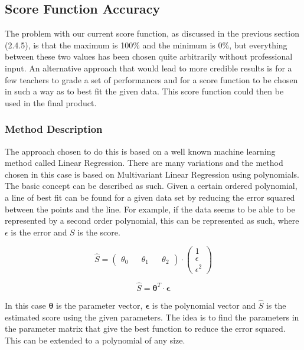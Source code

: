 \documentclass[11pt,a4paper]{article}
\begin{document}
\subsection{Score Function Accuracy}
\noindent
The problem with our current score function, as discussed in the previous section (2.4.5), is that the maximum is 100\% and the minimum is 0\%, but everything between these two values has been chosen quite arbitrarily without professional input. An alternative approach that would lead to more credible results is for a few  teachers to grade a set of performances and for a score function to be chosen in such a way as to best fit the given data. This score function could then be used in the final product.

\subsubsection{Method Description}
\noindent
The approach chosen to do this is based on a well known machine learning method called Linear Regression. There are many variations and the method chosen in this case is based on Multivariant Linear Regression using polynomials. The basic concept can be described as such. Given a certain ordered polynomial, a line of best fit can be found for a given data set by reducing the error squared between the points and the line. For example, if the data seems to be able to be represented by a second order polynomial, this can be represented as such, where $\epsilon$ is the error and $S$ is the score.

\begin{equation}
\hat{S} = \begin{pmatrix}
  \theta_0 &&
  \theta_1 &&
  \theta_2
 \end{pmatrix}
 \cdot
 \begin{pmatrix}
   1 \\
   \epsilon\\
   \epsilon^2
 \end{pmatrix}
\end{equation} 

\begin{equation}
\hat{S} = \boldsymbol \theta^T \cdot \boldsymbol \epsilon
\end{equation} 


\noindent
In this case $\boldsymbol \theta$ is the parameter vector, $\boldsymbol \epsilon$ is the polynomial vector and $\hat{S} $ is the estimated score using the given parameters. The idea is to find the parameters in the parameter matrix that give the best function to reduce the error squared. This can be extended to a polynomial of any size.
 
\end{document}
